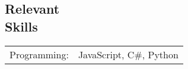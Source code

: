 \documentclass[margin,line,pifont,palatino,courier]{res}
\begin{document}
\begin{resume}

\section{\sc Relevant \\ Skills}

\begin{tabular}{@{}p{0.8in}p{6in}}

Programming:& JavaScript, C\#, Python  \\

\end{tabular}




\end{resume}
\end{document}
